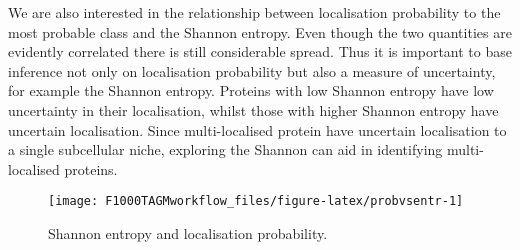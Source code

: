\documentclass[9pt,a4paper,]{extarticle}
\newenvironment{Shaded}{\begin{snugshade}}{\end{snugshade}}
\newcommand{\DataTypeTok}[1]{\textcolor[rgb]{0.13,0.29,0.53}{#1}}
\newcommand{\DecValTok}[1]{\textcolor[rgb]{0.00,0.00,0.81}{#1}}
\newcommand{\FloatTok}[1]{\textcolor[rgb]{0.00,0.00,0.81}{#1}}
\newcommand{\KeywordTok}[1]{\textcolor[rgb]{0.13,0.29,0.53}{\textbf{#1}}}
\newcommand{\NormalTok}[1]{#1}
\newcommand{\OperatorTok}[1]{\textcolor[rgb]{0.81,0.36,0.00}{\textbf{#1}}}
\newcommand{\StringTok}[1]{\textcolor[rgb]{0.31,0.60,0.02}{#1}}
\begin{document}
We are also interested in the relationship between localisation
probability to the most probable class and the Shannon
entropy. Even though the two quantities are evidently correlated there
is still considerable spread. Thus it is important to base inference
not only on localisation probability but also a measure of uncertainty,
for example the Shannon entropy. Proteins with low Shannon entropy
have low uncertainty in their localisation, whilst those with higher Shannon
entropy have uncertain localisation. Since multi-localised protein have
uncertain localisation to a single subcellular niche, exploring the Shannon
can aid in identifying multi-localised proteins.

\begin{Shaded}
\end{Shaded}

\begin{figure}

{\centering \texttt{[image: F1000TAGMworkflow\_files/figure-latex/probvsentr-1]} 

}

\caption{Shannon entropy and localisation probability.}\label{fig:probvsentr}
\end{figure}
\end{document}
